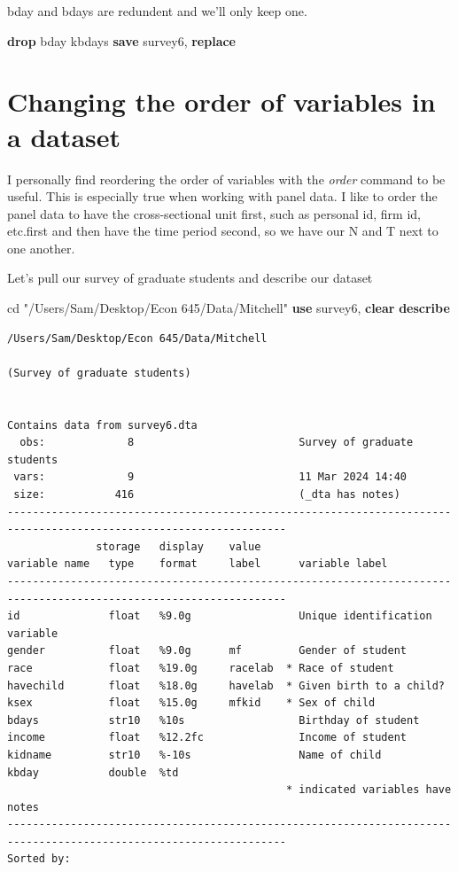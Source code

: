 \documentclass[
]{book}
\newenvironment{Shaded}{\begin{snugshade}}{\end{snugshade}}
\newcommand{\KeywordTok}[1]{\textcolor[rgb]{0.13,0.29,0.53}{\textbf{#1}}}
\newcommand{\NormalTok}[1]{#1}
\newcommand{\StringTok}[1]{\textcolor[rgb]{0.31,0.60,0.02}{#1}}
\begin{document}
bday and bdays are redundent and we'll only keep one.

\begin{Shaded}
\begin{Highlighting}[]
\KeywordTok{drop}\NormalTok{ bday kbdays}
\KeywordTok{save}\NormalTok{ survey6, }\KeywordTok{replace}
\end{Highlighting}
\end{Shaded}

\section{Changing the order of variables in a dataset}\label{changing-the-order-of-variables-in-a-dataset}

I personally find reordering the order of variables with the \emph{order} command to be useful. This is especially true when working with panel data. I like to order the panel data to have the cross-sectional unit first, such as personal id, firm id, etc.first and then have the time period second, so we have our N and T next to one another.

Let's pull our survey of graduate students and describe our dataset

\begin{Shaded}
\begin{Highlighting}[]
\NormalTok{cd }\StringTok{"/Users/Sam/Desktop/Econ 645/Data/Mitchell"}
\KeywordTok{use}\NormalTok{ survey6, }\KeywordTok{clear}
\KeywordTok{describe}
\end{Highlighting}
\end{Shaded}

\begin{verbatim}
/Users/Sam/Desktop/Econ 645/Data/Mitchell

(Survey of graduate students)


Contains data from survey6.dta
  obs:             8                          Survey of graduate students
 vars:             9                          11 Mar 2024 14:40
 size:           416                          (_dta has notes)
------------------------------------------------------------------------------------------------------------------
              storage   display    value
variable name   type    format     label      variable label
------------------------------------------------------------------------------------------------------------------
id              float   %9.0g                 Unique identification variable
gender          float   %9.0g      mf         Gender of student
race            float   %19.0g     racelab  * Race of student
havechild       float   %18.0g     havelab  * Given birth to a child?
ksex            float   %15.0g     mfkid    * Sex of child
bdays           str10   %10s                  Birthday of student
income          float   %12.2fc               Income of student
kidname         str10   %-10s                 Name of child
kbday           double  %td                   
                                            * indicated variables have notes
------------------------------------------------------------------------------------------------------------------
Sorted by: 
\end{verbatim}
\end{document}
